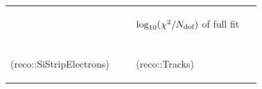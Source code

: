 \documentclass[12pt,compress]{beamer}
\begin{document}
\begin{frame}
\begin{center}
\begin{tabular}{p{0.45\linewidth} p{0.45\linewidth}}
\begin{minipage}{\linewidth}
\end{minipage} &
\begin{minipage}{\linewidth}
\begin{center}
$\log_{10}(\chi^2/N_{\mbox{\scriptsize dof}})$ of full fit
\end{center}
\end{minipage} \\
& \\
\begin{minipage}{\linewidth}
\begin{center}
(reco::SiStripElectrons)
\end{center}
\end{minipage} &
\begin{minipage}{\linewidth}
\begin{center}
(reco::Tracks)
\end{center}
\end{minipage}
\end{tabular}
\end{center}
\end{frame}


\end{document}
